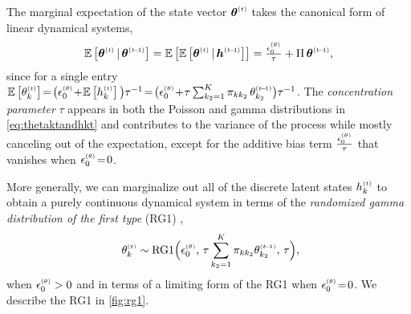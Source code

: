 \documentclass{article}
\begin{document}
The marginal expectation of the state vector $\boldsymbol{\theta}^{\mathsmaller{(t)}}$ takes the canonical form of linear dynamical systems,~
\begin{align}
\mathbb{E}\left[\boldsymbol{\theta}^{\mathsmaller{(t)}} \given \boldsymbol{\theta}^{\mathsmaller{(t \tm 1)}}\right] = \mathbb{E}\left[\mathbb{E}\left[\boldsymbol{\theta}^{\mathsmaller{(t)}} \given \boldsymbol{h}^{\mathsmaller{(t \tm 1)}}\right]\right] = \tfrac{\epstheta}{\tau} + \Pi \, \boldsymbol{\theta}^{\mathsmaller{(t \tm 1)}},
\end{align}
since for a single entry $\E{\thetakt} \teq \big(\epstheta \tp \E{\hkt}\big)\tau^{-1} \teq \big(\epstheta \tp \tau \sum_{k_2 = 1}^K \pi_{kk_2} \,\thetakttm \big) \tau^{-1}$. The \emph{concentration parameter} $\tau$ appears in both the Poisson and gamma distributions in \cref{eq:thetaktandhkt} and contributes to the variance of the process while mostly canceling out of the expectation, except for the additive bias term $\tfrac{\epstheta}{\tau}$ that vanishes when $\epstheta \teq 0$.


More generally, we can marginalize out all of the discrete latent states $\hkt$ to obtain a purely continuous dynamical system in terms of the \emph{randomized gamma distribution of the first type} (RG1) \cite{yuan2000bessel,makarov2010exact},~
\begin{equation}
\
\thetakt \sim \textrm{RG1}\Big(\epstheta,\,\tau\sum_{k_2=1}^K \pi_{kk_2} \thetakttm,\, \tau\Big),
% 
\end{equation}
when $\epstheta > 0$ and in terms of a limiting form of the RG1 when $\epstheta \teq 0$. We describe the RG1 in \cref{fig:rg1}.~


\end{document}
